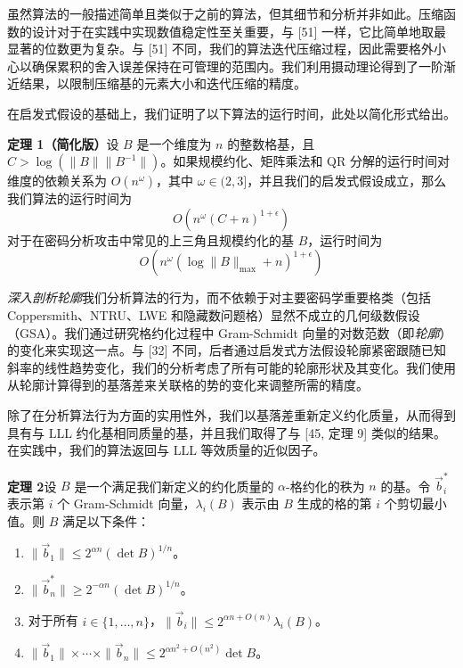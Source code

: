 \documentclass[UTF8]{ctexart}
\begin{document}
    虽然算法的一般描述简单且类似于之前的算法，但其细节和分析并非如此。压缩函数的设计对于在实践中实现数值稳定性至关重要，与 [51] 一样，它比简单地取最显著的位数更为复杂。与 [51] 不同，我们的算法迭代压缩过程，因此需要格外小心以确保累积的舍入误差保持在可管理的范围内。我们利用摄动理论得到了一阶渐近结果，以限制压缩基的元素大小和迭代压缩的精度。

    在启发式假设的基础上，我们证明了以下算法的运行时间，此处以简化形式给出。
    
        {\bf 定理 1（简化版）}\quad 设 \( B \) 是一个维度为 \( n \) 的整数格基，且 \( C > \log(\|B\|\|B^{-1}\|) \)。如果规模约化、矩阵乘法和 QR 分解的运行时间对维度的依赖关系为 \( O(n^\omega) \)，其中 \( \omega \in (2, 3] \)，并且我们的启发式假设成立，那么我们算法的运行时间为
    \[ O(n^\omega (C + n)^{1 + \epsilon}) \]
    对于在密码分析攻击中常见的上三角且规模约化的基 \( B \)，运行时间为
    \[ O(n^\omega (\log \|B\|_{\max} + n)^{1 + \epsilon}) \]

    \emph{深入剖析轮廓}\quad 我们分析算法的行为，而不依赖于对主要密码学重要格类（包括 Coppersmith、NTRU、LWE 和隐藏数问题格）显然不成立的几何级数假设（GSA）。我们通过研究格约化过程中 Gram-Schmidt 向量的对数范数（即\emph{轮廓}）的变化来实现这一点。与 [32] 不同，后者通过启发式方法假设轮廓紧密跟随已知斜率的线性趋势变化，我们的分析考虑了所有可能的轮廓形状及其变化。我们使用从轮廓计算得到的基落差来关联格的势的变化来调整所需的精度。

    除了在分析算法行为方面的实用性外，我们以基落差重新定义约化质量，从而得到具有与 LLL 约化基相同质量的基，并且我们取得了与 [45, 定理 9] 类似的结果。在实践中，我们的算法返回与 LLL 等效质量的近似因子。

    {\bf 定理 2}\quad 设 \( B \) 是一个满足我们新定义的约化质量的 \( \alpha \)-格约化的秩为 \( n \) 的基。令 \(\vec{b}_i^*\) 表示第 \( i \) 个 Gram-Schmidt 向量，\(\lambda_i(B)\) 表示由 \( B \) 生成的格的第 \( i \) 个剪切最小值。则 \( B \) 满足以下条件：
    \begin{enumerate}
        \item \(\|\vec{b}_1\| \leq 2^{\alpha n} (\det B)^{1/n}\)。
        \item \(\|\vec{b}_n^*\| \geq 2^{-\alpha n} (\det B)^{1/n}\)。
        \item 对于所有 \( i \in \{1, \dots, n\} \)，\(\|\vec{b}_i\| \leq 2^{\alpha n + O(n)} \lambda_i(B)\)。
        \item \(\|\vec{b}_1\| \times \cdots \times \|\vec{b}_n\| \leq 2^{\alpha n^2 + O(n^2)} \det B\)。
    \end{enumerate}
\end{document}
